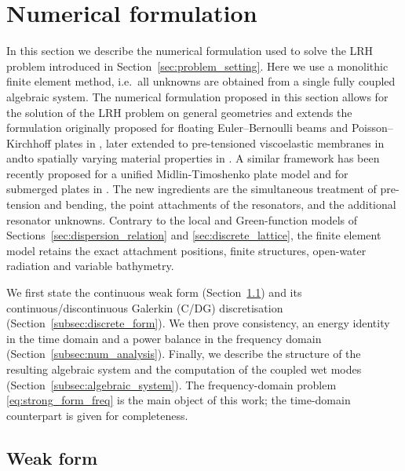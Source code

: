 \section{Numerical formulation}\label{sec:numerical_formulation}
In this section we describe the numerical formulation used to solve the LRH problem introduced in Section~\ref{sec:problem_setting}. Here we use a monolithic finite element method, i.e.\ all unknowns are obtained from a single fully coupled algebraic system. The numerical formulation proposed in this section allows for the solution of the LRH problem on general geometries and extends the formulation originally proposed for floating Euler--Bernoulli beams and Poisson--Kirchhoff plates in \cite{colomes2023monolithic}, later extended to pre-tensioned viscoelastic membranes in \cite{agarwal2024dynamic} andto spatially varying material properties in \cite{el4911089optimization}. A similar framework has been recently proposed for a unified Midlin-Timoshenko plate model \cite{pradnyanata7048246unified} and for submerged plates in \cite{wegert2026discontinuous}. The new ingredients are the simultaneous treatment of pre-tension and bending, the point attachments of the resonators, and the additional resonator unknowns. Contrary to the local and Green-function models of Sections~\ref{sec:dispersion_relation} and \ref{sec:discrete_lattice}, the finite element model retains the exact attachment positions, finite structures, open-water radiation and variable bathymetry.

We first state the continuous weak form (Section~\ref{subsec:weak_form}) and its continuous/discontinuous Galerkin (C/DG) discretisation (Section~\ref{subsec:discrete_form}). We then prove consistency, an energy identity in the time domain and a power balance in the frequency domain (Section~\ref{subsec:num_analysis}). Finally, we describe the structure of the resulting algebraic system and the computation of the coupled wet modes (Section~\ref{subsec:algebraic_system}). The frequency-domain problem \eqref{eq:strong_form_freq} is the main object of this work; the time-domain counterpart is given for completeness.

\subsection{Weak form}\label{subsec:weak_form}


